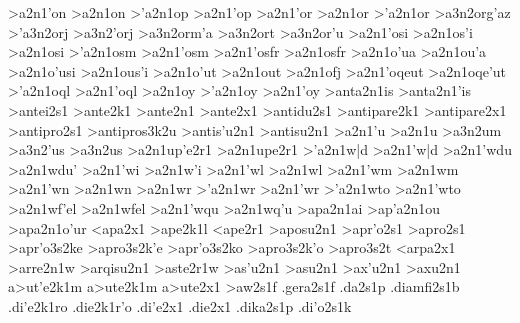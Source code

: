{>a2n1'on 		%
>a2n1on
>'a2n1op  		%
>a2n1'op
>a2n1'or     		%
>a2n1or
>'a2n1or     		%
	>a3n2org'az 		%
	>'a3n2orj   		%
	>a3n2'orj
	>a3n2orm'a  		%
	>a3n2ort    		%
	>a3n2or'u   		%
>a2n1'osi 		%
>a2n1os'i
>a2n1osi  		%
>'a2n1osm 		%
>a2n1'osm
>a2n1'osfr 		%
>a2n1osfr
>a2n1o'ua  		%
>a2n1ou'a
>a2n1o'usi 		%
>a2n1ous'i
>a2n1o'ut  		%
>a2n1out
>a2n1ofj   		%
>a2n1'oqeut 		%
>a2n1oqe'ut
>'a2n1oql  		%
>a2n1'oql
>a2n1oy    		%
>'a2n1oy   		%
>a2n1'oy
>anta2n1is  		%
>anta2n1'is 		%
>antei2s1   		%
>ante2k1    		%
>ante2n1    		%
>ante2x1    		%
>antidu2s1  		%
>antipare2k1 		%
>antipare2x1 		%
>antipro2s1 		%
	>antipros3k2u 		%
>antis'u2n1 		%
>antisu2n1
>a2n1'u   		%
>a2n1u
	>a3n2um 		%
	>a3n2'us 		%
	>a3n2us  		%
>a2n1up'e2r1 		%
>a2n1upe2r1
>'a2n1w|d		%
>a2n1'w|d
>a2n1'wdu  	%
>a2n1wdu'
>a2n1'wi    		%
>a2n1w'i
>a2n1'wl     		%
>a2n1wl
>a2n1'wm 		%
>a2n1wm
>a2n1'wn 		%
>a2n1wn
>a2n1wr  		%
>'a2n1wr 		%
>a2n1'wr
>'a2n1wto 		%
>a2n1'wto
>a2n1wf'el  		%
>a2n1wfel   		%
>a2n1'wqu 		%
>a2n1wq'u
>apa2n1ai 		%
>ap'a2n1ou 		%
>apa2n1o'ur
<apa2x1       		%
>ape2k1l 		%
<ape2r1      		%
>aposu2n1 		%
>apr'o2s1 		%
>apro2s1
	>apr'o3s2ke 		%
	>apro3s2k'e
	>apr'o3s2ko 		%
	>apro3s2k'o
	>apro3s2t 		%
<arpa2x1 		%
>arre2n1w 		%
>arqisu2n1 		%
>aste2r1w    		%
>as'u2n1     		%
>asu2n1
>ax'u2n1  		%
>axu2n1 
a>ut'e2k1m 		%
a>ute2k1m
a>ute2x1   		%
>aw2s1f    		%
.gera2s1f  		%
.da2s1p    		%
.diamfi2s1b 		%
.di'e2k1ro 		%
.die2k1r'o
.di'e2x1   		%
.die2x1    		%
.dika2s1p  		%
.di'o2s1k  		%
}
